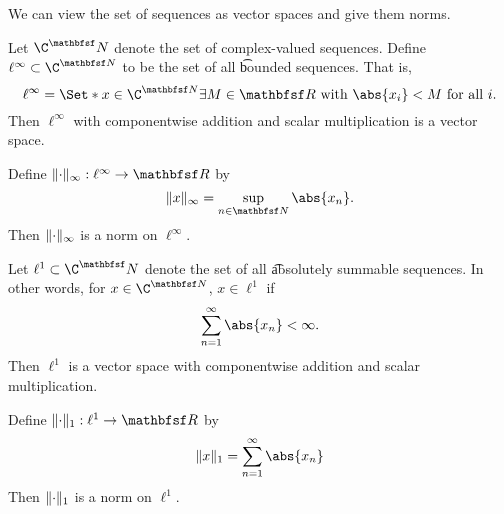
We can view the set of sequences as vector spaces and give them norms.


Let $\C ^\N $ denote the set of complex-valued sequences.
Define $\ell ^{\infty} \subset \C^{\N }$ to be the set of all \t{bounded sequences}.
That is,
  \[
\ell ^{\infty} = \Set*{x \in \C^{\N }}{\exists  M \in \R  \text{ with } \abs{x_i} < M \text{ for all } i}.
  \]
Then $\ell ^\infty$ with componentwise addition and scalar multiplication is a vector space.

\begin{exercise}
Define $\norm{\cdot}_{\infty}: \ell ^{\infty} \to \R $ by
  \[
\norm{x}_{\infty} = \sup_{n \in \N } \abs{x_n}.
  \]
Then $\lVert\cdot\rVert_{\infty}$ is a norm on $\ell ^\infty$.
\end{exercise}


Let $\ell ^1 \subset \C ^\N $ denote the set of all \t{absolutely summable sequences}. In other words, for $x \in \C ^{\N }$, $x \in \ell ^1$ if
  \[
\sum_{n = 1}^{\infty} \abs{x_n} < \infty.
  \]
Then $\ell ^1$ is a vector space with componentwise addition and scalar multiplication.

\begin{exercise}
Define $\norm{\cdot}_{1}: \ell ^{1} \to \R $ by
  \[
\norm{x}_{1} = \sum_{n = 1}^{\infty} \abs{x_n}
  \]
Then $\lVert\cdot\rVert_{1}$ is a norm on $\ell ^1$.
\end{exercise}
